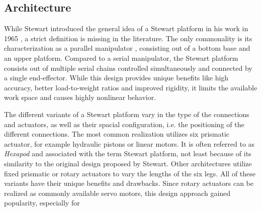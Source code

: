 \subsection{Architecture}
While Stewart introduced the general idea of a Stewart platform in his work in
1965 \citep{Ste65}, a strict definition is missing in the literature. The only
commonality is its characterization as a parallel manipulator \citep{Szu13},
consisting out of a bottom base and an upper platform. Compared to a serial
manipulator, the Stewart platform consists out of multiple serial chains
controlled simultaneously and connected by a single end-effector. While this
design provides unique benefits like high accuracy, better load-to-weight
ratios and improved rigidity, it limits the available work space and causes
highly nonlinear behavior.

The different variants of a Stewart platform vary in the type of the
connections and actuators, as well as their spacial configuration, i.e. the
positioning of the different connections. The most common realization utilizes
six prismatic actuator, for example hydraulic pistons or linear motors. It is
often referred to as \emph{Hexapod} and associated with the term Stewart
platform, not least because of its similarity to the original design proposed
by Stewart. Other architectures utilize fixed prismatic or rotary actuators to
vary the lengths of the six legs. All of these variants have their unique
benefits and drawbacks. Since rotary actuators can be realized as commonly
available servo motors, this design approach gained popularity, especially for
